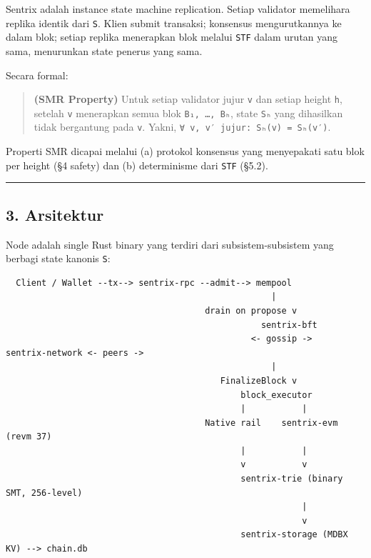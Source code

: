 \documentclass[11pt,a4paper]{article}
\newenvironment{Shaded}{}{}
\begin{document}
Sentrix adalah instance state machine replication. Setiap validator memelihara replika identik dari \texttt{S}. Klien submit transaksi; konsensus mengurutkannya ke dalam blok; setiap replika menerapkan blok melalui \texttt{STF} dalam urutan yang sama, menurunkan state penerus yang sama.

Secara formal:

\begin{quote}
\textbf{(SMR Property)} Untuk setiap validator jujur \texttt{v} dan setiap height \texttt{h}, setelah \texttt{v} menerapkan semua blok \texttt{B₁,\ …,\ Bₕ}, state \texttt{Sₕ} yang dihasilkan tidak bergantung pada \texttt{v}. Yakni, \texttt{∀\ v,\ v′\ jujur:\ Sₕ(v)\ =\ Sₕ(v′)}.
\end{quote}

Properti SMR dicapai melalui (a) protokol konsensus yang menyepakati satu blok per height (§4 safety) dan (b) determinisme dari \texttt{STF} (§5.2).

\begin{center}\rule{0.5\linewidth}{0.5pt}\end{center}

\hypertarget{arsitektur}{%
\subsection{3. Arsitektur}\label{arsitektur}}

Node adalah single Rust binary yang terdiri dari subsistem-subsistem yang berbagi state kanonis \texttt{S}:


\begin{Shaded}
\begin{verbatim}
  Client / Wallet --tx--> sentrix-rpc --admit--> mempool
                                                    |
                                       drain on propose v
                                                  sentrix-bft
                                                <- gossip ->   sentrix-network <- peers ->
                                                    |
                                          FinalizeBlock v
                                              block_executor
                                              |           |
                                       Native rail    sentrix-evm (revm 37)
                                              |           |
                                              v           v
                                              sentrix-trie (binary SMT, 256-level)
                                                          |
                                                          v
                                              sentrix-storage (MDBX KV) --> chain.db
\end{verbatim}
\end{Shaded}
\end{document}
